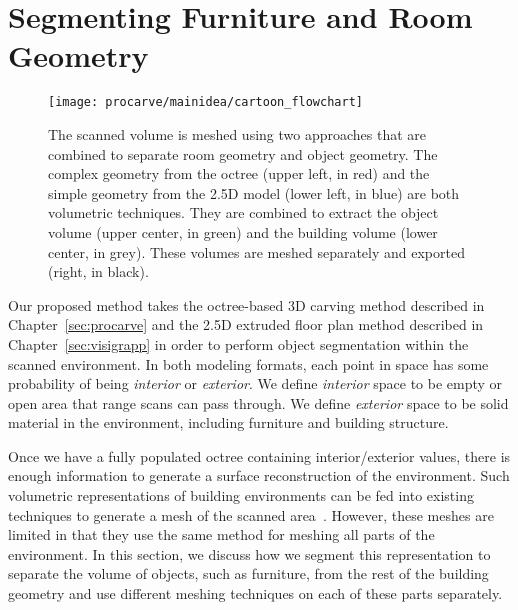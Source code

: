 \documentclass[12pt,onecolumn,oneside]{book}
\begin{document}
\FloatBarrier
\section{Segmenting Furniture and Room Geometry}
\label{sec:procarve_main_idea}

\begin{figure}[t]
	\centerline{\texttt{[image: procarve/mainidea/cartoon\_flowchart]}}
	\caption[Diagram showing how models are used to segment objects in scene.]{The scanned volume is meshed using two approaches that are combined to separate room geometry and object geometry.  The complex geometry from the octree (upper left, in red) and the simple geometry from the 2.5D model (lower left, in blue) are both volumetric techniques.  They are combined to extract the object volume (upper center, in green) and the building volume (lower center, in grey).  These volumes are meshed separately and exported (right, in black).}
	\label{fig:procarve_mainidea}
\end{figure}

Our proposed method takes the octree-based 3D carving method described in Chapter~\ref{sec:procarve} and the 2.5D extruded floor plan method described in Chapter~\ref{sec:visigrapp} in order to perform object segmentation within the scanned environment.  In both modeling formats, each point in space has some probability of being {\it interior} or {\it exterior}.  We define {\it interior} space to be empty or open area that range scans can pass through.  We define {\it exterior} space to be solid material in the environment, including furniture and building structure.

Once we have a fully populated octree containing interior/exterior values, there is enough information to generate a surface reconstruction of the environment.  Such volumetric representations of building environments can be fed into existing techniques to generate a mesh of the scanned area~\cite{Turner13,Kintinuous,Carving}.  However, these meshes are limited in that they use the same method for meshing all parts of the environment.  In this section, we discuss how we segment this representation to separate the volume of objects, such as furniture, from the rest of the building geometry and use different meshing techniques on each of these parts separately.
\end{document}
